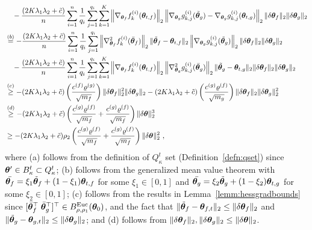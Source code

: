 \begin{align*}
    & \quad - \frac{(2K\lambda_1\lambda_2+\tilde{c})}{n} \sum_{i=1}^n \frac{1}{q_i} \sum_{j=1}^{q_i} \sum_{k=1}^K \left\| \nabla_{{\bm{\theta}}_f} f_k^{(i)}({\bm{\theta}}_{t,f}) \right\|_2 \left\| \nabla_{{\bm{\theta}}_g} g_{k,j}^{(i)}(\tilde{{\bm{\theta}}}_g) - \nabla_{{\bm{\theta}}_g} g_{k,j}^{(i)}({\bm{\theta}}_{t,g})  \right\|_2 \| \delta {\bm{\theta}}_f \|_2 \| \delta {\bm{\theta}}_g \|_2 \\
    & \overset{(b)}{=} -  \frac{(2K\lambda_1\lambda_2+\tilde{c})}{n} \sum_{i=1}^n \frac{1}{q_i} \sum_{j=1}^{q_i}  \left\| \nabla^2_{{\bm{\theta}}_f} f_k^{(i)}(\bar{{\bm{\theta}}}_f)\right\|_2 \lVert\tilde{{\bm{\theta}}}_f-{\bm{\theta}}_{t,f}\rVert_2 \left\| \nabla_{{\bm{\theta}}_g} g_{k,j}^{(i)}(\tilde{{\bm{\theta}}}_g) \right\|_2 \| \delta {\bm{\theta}}_f \|_2 \| \delta {\bm{\theta}}_g \|_2 \\
    & \quad - \frac{(2K\lambda_1\lambda_2+\tilde{c})}{n} \sum_{i=1}^n \frac{1}{q_i} \sum_{j=1}^{q_i} \sum_{k=1}^K \left\| \nabla_{{\bm{\theta}}_f} f_k^{(i)}({\bm{\theta}}_{t,f}) \right\|_2 \left\| \nabla^2_{{\bm{\theta}}_g} g_{k,j}^{(i)}(\bar{{\bm{\theta}}}_g) \right\|_2\lVert\tilde{{\bm{\theta}}}_g-{\bm{\theta}}_{t,g}\rVert_2 \| \delta {\bm{\theta}}_f \|_2 \| \delta {\bm{\theta}}_g \|_2 \\
    & \overset{(c)}{\geq} - (2K\lambda_1\lambda_2+\tilde{c})\left( \frac{c^{(f)} \varrho^{(g)}}{\sqrt{m_f}} \right) \| \delta {\bm{\theta}}_f \|_2^2 \| \delta {\bm{\theta}}_g \|_2 
    - (2K\lambda_1\lambda_2+\tilde{c})\left( \frac{c^{(g)} \varrho^{(f)}}{\sqrt{m_g}} \right) \| \delta {\bm{\theta}}_f \|_2 \| \delta {\bm{\theta}}_g \|_2^2
    \\
    & \overset{(d)}{\geq} - (2K\lambda_1\lambda_2+\tilde{c})\left( \frac{c^{(g)} \varrho^{(f)}}{\sqrt{m_f}} + \frac{c^{(g)} \varrho^{(f)}}{\sqrt{m_f}} \right) \| \delta {\bm{\theta}} \|_2^3\\
    & \geq - (2K\lambda_1\lambda_2+\tilde{c})\rho_2 \left( \frac{c^{(g)} \varrho^{(f)}}{\sqrt{m_f}} + \frac{c^{(g)} \varrho^{(f)}}{\sqrt{m_f}} \right) \| \delta {\bm{\theta}} \|_2^2 ~,
\end{align*}
where (a) follows from the definition of $Q_{\kappa}^t$ set %
(Definition~\ref{defn:qset}) 
since ${\bm{\theta}}' \in B^t_\kappa\subset Q^t_\kappa$; %
(b) follows from the generalized mean value theorem with $\bar{{\bm{\theta}}_f}=\xi_1\tilde{{\bm{\theta}}}_f+(1-\xi_1){\bm{\theta}}_{t,f}$ for some $\xi_1\in[0,1]$ and $\bar{{\bm{\theta}}_g}=\xi_2\tilde{{\bm{\theta}}}_g+(1-\xi_2){\bm{\theta}}_{t,g}$ for some $\xi_2\in[0,1]$; (c) follows from the results in Lemma~\ref{lemm:hessgradbounds} since $[\bar{{\bm{\theta}}}_f^\top\; \bar{{\bm{\theta}}}_g^\top]^\top \in B^{\mathrm{Euc}}_{\rho,\rho_1}({\bm{\theta}}_0)$, and the fact that $\| \tilde{{\bm{\theta}}}_f - {\bm{\theta}}_{f,t} \|_2 \leq \| \delta {\bm{\theta}}_f \|_2$ and $\| \tilde{{\bm{\theta}}}_g - {\bm{\theta}}_{g,t} \|_2 \leq \| \delta {\bm{\theta}}_g \|_2$; and (d) follows from $\lVert\delta{\bm{\theta}}_f\rVert_2,\lVert\delta{\bm{\theta}}_g\rVert_2\leq \lVert\delta{\bm{\theta}}\rVert_2$.

